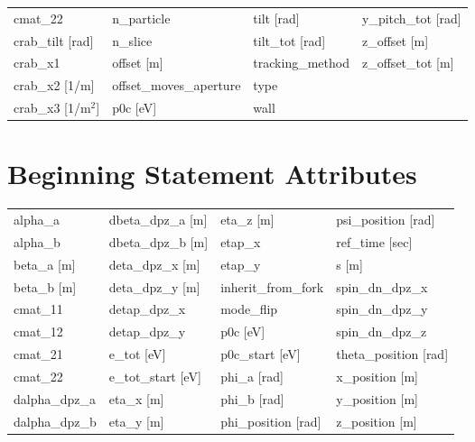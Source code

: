 \begin{tabular}{llll}
cmat_22                          & n_particle                       & tilt [rad]                       & y_pitch_tot [rad]                \\
crab_tilt [rad]                  & n_slice                          & tilt_tot [rad]                   & z_offset [m]                     \\
crab_x1                          & offset [m]                       & tracking_method                  & z_offset_tot [m]                 \\
crab_x2 [1/m]                    & offset_moves_aperture            & type                             &                                  \\
crab_x3 [1/m$^2$]                & p0c [eV]                         & wall                             &                                  \\
 \bottomrule
 \end{tabular}
 \vfill
 
 \section{Beginning Statement Attributes}
 \label{s:list.beginning}
 
 \begin{tabular}{llll} \toprule
alpha_a                          & dbeta_dpz_a [m]                  & eta_z [m]                        & psi_position [rad]               \\
alpha_b                          & dbeta_dpz_b [m]                  & etap_x                           & ref_time [sec]                   \\
beta_a [m]                       & deta_dpz_x [m]                   & etap_y                           & s [m]                            \\
beta_b [m]                       & deta_dpz_y [m]                   & inherit_from_fork                & spin_dn_dpz_x                    \\
cmat_11                          & detap_dpz_x                      & mode_flip                        & spin_dn_dpz_y                    \\
cmat_12                          & detap_dpz_y                      & p0c [eV]                         & spin_dn_dpz_z                    \\
cmat_21                          & e_tot [eV]                       & p0c_start [eV]                   & theta_position [rad]             \\
cmat_22                          & e_tot_start [eV]                 & phi_a [rad]                      & x_position [m]                   \\
dalpha_dpz_a                     & eta_x [m]                        & phi_b [rad]                      & y_position [m]                   \\
dalpha_dpz_b                     & eta_y [m]                        & phi_position [rad]               & z_position [m]                   \\
 \bottomrule
 \end{tabular}
 \vfill
 
